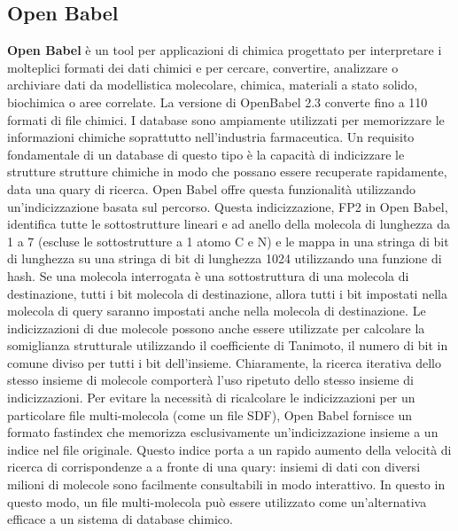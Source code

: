 \subsection{Open Babel}
\textbf{Open Babel} è un tool per applicazioni di chimica progettato per interpretare i molteplici formati dei dati chimici e per cercare, convertire, analizzare o archiviare dati da modellistica molecolare, chimica, materiali a stato solido, biochimica o aree correlate.\newline
La versione di OpenBabel 2.3 converte fino a 110 formati di file chimici.\newline
I database sono ampiamente utilizzati per memorizzare le informazioni chimiche soprattutto nell'industria farmaceutica. Un requisito fondamentale di un database di questo tipo è la capacità di indicizzare le strutture strutture chimiche in modo che possano essere recuperate rapidamente, data una quary di ricerca. Open Babel offre questa funzionalità utilizzando un'indicizzazione basata sul percorso. Questa indicizzazione, FP2 in Open Babel, identifica tutte le sottostrutture lineari e ad anello della molecola di lunghezza da 1 a 7 (escluse le sottostrutture a 1 atomo C e N) e le mappa in una stringa di bit di lunghezza su una stringa di bit di lunghezza 1024 utilizzando una funzione di hash. Se una molecola interrogata è una sottostruttura di una molecola di destinazione, tutti i bit molecola di destinazione, allora tutti i bit impostati nella molecola di query saranno impostati anche nella molecola di destinazione. Le indicizzazioni
di due molecole possono anche essere utilizzate per calcolare la somiglianza strutturale utilizzando il coefficiente di Tanimoto, il numero di bit in comune diviso per tutti i bit dell'insieme.
Chiaramente, la ricerca iterativa dello stesso insieme di molecole comporterà l'uso ripetuto dello stesso insieme di indicizzazioni. Per evitare la necessità di ricalcolare le indicizzazioni per un particolare file multi-molecola (come un file SDF), Open Babel fornisce un formato fastindex che memorizza esclusivamente un'indicizzazione insieme a un indice nel file originale. Questo indice porta a un rapido aumento della velocità di ricerca di corrispondenze a a fronte di una quary: insiemi di dati con diversi milioni di molecole sono facilmente consultabili in modo interattivo. In questo in questo modo, un file multi-molecola può essere utilizzato come un'alternativa efficace a un sistema di database chimico\cite{o2011open}.

